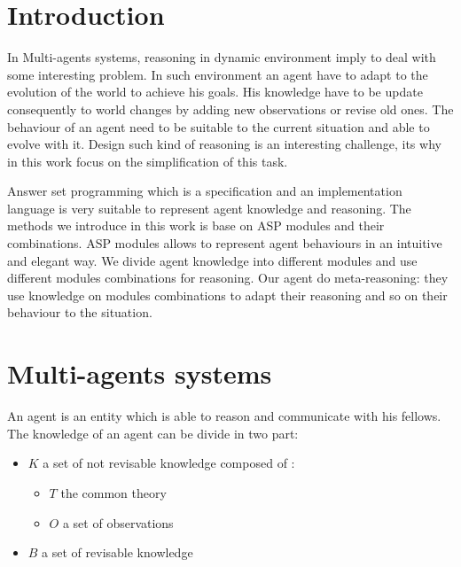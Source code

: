 \documentclass{aamas2012}
\begin{document}



\section{Introduction}

	In Multi-agents systems, reasoning in dynamic environment imply to deal with some interesting problem.
	In such environment an agent have to adapt to the evolution of the world to achieve his goals.
	His knowledge have to be update consequently to world changes by adding new observations or revise old ones.
	The behaviour of an agent need to be suitable to the current situation and able to evolve with it.
	Design such kind of reasoning is an interesting challenge, its why in this work focus on the simplification of this task.
	
	Answer set programming which is a specification and an implementation language is very suitable to represent agent knowledge and reasoning.
	The methods we introduce in this work is base on ASP modules and their combinations.
	ASP modules allows to represent agent behaviours in an intuitive and elegant way.
	We divide agent knowledge into different modules and use different modules combinations for reasoning.
	Our agent do meta-reasoning: they use knowledge on modules combinations to adapt their reasoning and so on their behaviour to the situation.

\section{Multi-agents systems}

	\begin{definition}[Agent]
		\label{agent_definition}
		An agent is an entity which is able to reason and communicate with his fellows.
		The knowledge of an agent can be divide in two part:\newline
		\begin{itemize}
			\item $K$ a set of not revisable knowledge composed of :
			\begin{itemize}
				\item $T$ the common theory
				\item $O$ a set of observations
			\end{itemize}
			\item $B$ a set of revisable knowledge
		\end{itemize}
	\end{definition}
	
\end{document}
